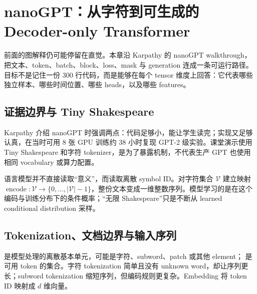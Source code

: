 \section{nanoGPT：从字符到可生成的 Decoder-only Transformer}

前面的图解释仍可能停留在直觉。本章沿 Karpathy 的 nanoGPT walkthrough，把文本、token、batch、block、loss、mask 与 generation 连成一条可运行路径。目标不是记住一份 300 行代码，而是能够在每个 tensor 维度上回答：它代表哪些独立样本、哪些时间位置、哪些 heads，以及哪些 features。

\subsection{证据边界与 Tiny Shakespeare}

Karpathy 介绍 nanoGPT 时强调两点：代码足够小，能让学生读完；实现又足够认真，在当时可用 8 张 GPU 训练约 38 小时复现 GPT-2 级实验。课堂演示使用 Tiny Shakespeare 和字符 tokenizer，是为了暴露机制，不代表生产 GPT 也使用相同 vocabulary 或算力配置。




语言模型并不直接读取“意义”，而读取离散 symbol ID。对字符集合 $\mathcal V$ 建立映射 $\operatorname{encode}:\mathcal V\to\{0,\ldots,|\mathcal V|-1\}$，整份文本变成一维整数序列。模型学习的是在这个编码与训练分布下的条件概率；“无限 Shakespeare”只是不断从 learned conditional distribution 采样。

\subsection{Tokenization、文档边界与输入序列}

 是模型处理的离散基本单元，可能是字符、subword、patch 或其他 element； 是可用 token 的集合。字符 tokenization 简单且没有 unknown word，却让序列更长；subword tokenization 缩短序列，但编码规则更复杂。Embedding 将 token ID 映射成 $d$ 维向量。



